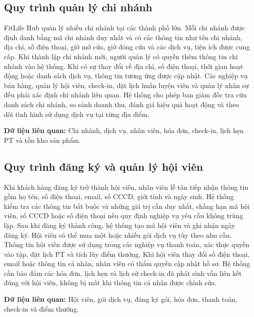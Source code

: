 \documentclass[11pt, a4paper]{article}
\begin{document}
\subsection{Quy trình quản lý chi nhánh}
FitLife Hub quản lý nhiều chi nhánh tại các thành phố lớn. Mỗi chi nhánh được định danh bằng mã chi nhánh duy nhất và có các thông tin như tên chi nhánh, địa chỉ, số điện thoại, giờ mở cửa, giờ đóng cửa và các dịch vụ, tiện ích được cung cấp. Khi thành lập chi nhánh mới, người quản lý có quyền thêm thông tin chi nhánh vào hệ thống. Khi có sự thay đổi về địa chỉ, số điện thoại, thời gian hoạt động hoặc danh sách dịch vụ, thông tin tương ứng được cập nhật. Các nghiệp vụ bán hàng, quản lý hội viên, check-in, đặt lịch huấn luyện viên và quản lý nhân sự đều phải xác định chi nhánh liên quan. Hệ thống cho phép ban giám đốc tra cứu danh sách chi nhánh, so sánh doanh thu, đánh giá hiệu quả hoạt động và theo dõi tình hình sử dụng dịch vụ tại từng địa điểm.

\textbf{Dữ liệu liên quan:} Chi nhánh, dịch vụ, nhân viên, hóa đơn, check-in, lịch hẹn PT và tồn kho sản phẩm.

\subsection{Quy trình đăng ký và quản lý hội viên}
Khi khách hàng đăng ký trở thành hội viên, nhân viên lễ tân tiếp nhận thông tin gồm họ tên, số điện thoại, email, số CCCD, giới tính và ngày sinh. Hệ thống kiểm tra các thông tin bắt buộc và những giá trị cần duy nhất, chẳng hạn mã hội viên, số CCCD hoặc số điện thoại nếu quy định nghiệp vụ yêu cầu không trùng lặp. Sau khi đăng ký thành công, hệ thống tạo mã hội viên và ghi nhận ngày đăng ký. Hội viên có thể mua một hoặc nhiều gói dịch vụ tùy theo nhu cầu. Thông tin hội viên được sử dụng trong các nghiệp vụ thanh toán, xác thực quyền vào tập, đặt lịch PT và tích lũy điểm thưởng. Khi hội viên thay đổi số điện thoại, email hoặc thông tin cá nhân, nhân viên có thẩm quyền cập nhật hồ sơ. Hệ thống cần bảo đảm các hóa đơn, lịch hẹn và lịch sử check-in đã phát sinh vẫn liên kết đúng với hội viên, không bị mất khi thông tin cá nhân được chỉnh sửa.

\textbf{Dữ liệu liên quan:} Hội viên, gói dịch vụ, đăng ký gói, hóa đơn, thanh toán, check-in và điểm thưởng.
\end{document}
